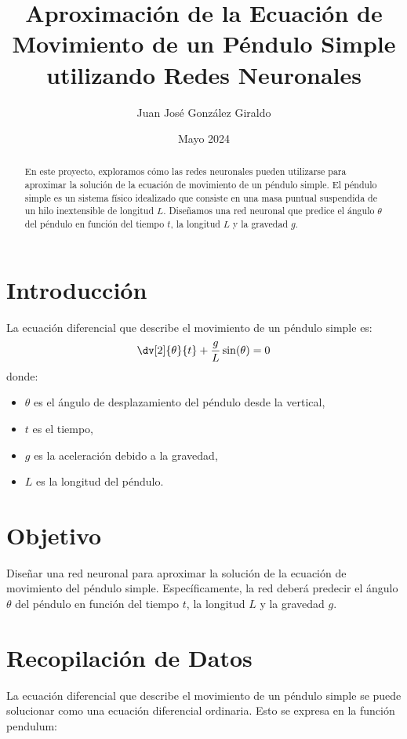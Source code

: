 \documentclass[a4paper,12pt]{article}
\title{Aproximación de la Ecuación de Movimiento de un Péndulo Simple utilizando Redes Neuronales}
\author{Juan José González Giraldo}
\date{Mayo 2024}
\begin{document}
\maketitle

\begin{abstract}
    En este proyecto, exploramos cómo las redes neuronales pueden utilizarse para aproximar la solución de la ecuación de movimiento de un péndulo simple. El péndulo simple es un sistema físico idealizado que consiste en una masa puntual suspendida de un hilo inextensible de longitud \(L\). Diseñamos una red neuronal que predice el ángulo \(\theta\) del péndulo en función del tiempo \(t\), la longitud \(L\) y la gravedad \(g\).
\end{abstract}

\section{Introducción}
La ecuación diferencial que describe el movimiento de un péndulo simple es:
\begin{equation}
    \dv[2]{\theta}{t} + \frac{g}{L} \sin(\theta) = 0
\end{equation}
donde:
\begin{itemize}
    \item \(\theta\) es el ángulo de desplazamiento del péndulo desde la vertical,
    \item \(t\) es el tiempo,
    \item \(g\) es la aceleración debido a la gravedad,
    \item \(L\) es la longitud del péndulo.
\end{itemize}

\section{Objetivo}
Diseñar una red neuronal para aproximar la solución de la ecuación de movimiento del péndulo simple. Específicamente, la red deberá predecir el ángulo \(\theta\) del péndulo en función del tiempo \(t\), la longitud \(L\) y la gravedad \(g\).

\section{Recopilación de Datos}
La ecuación diferencial que describe el movimiento de un péndulo simple se puede solucionar como una ecuación diferencial ordinaria. Esto se expresa en la función pendulum:
\end{document}
